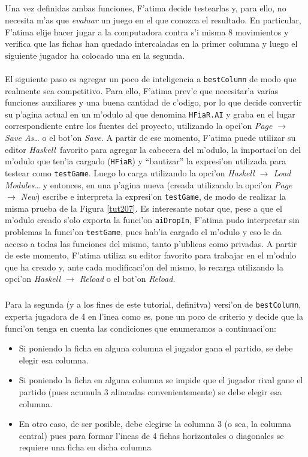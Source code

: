 \documentclass[a4paper]{article}
\newcommand{\haskell}{\textsl{Haskell}}
\begin{document}
\newpage
\subparagraph{}Una vez definidas ambas funciones, F'atima decide testearlas y, para ello, no necesita m'as que \textsl{evaluar} un juego en el que conozca el resultado.  En particular, F'atima elije hacer jugar a la computadora contra s'i misma 8 movimientos y verifica que las fichas han quedado intercaladas en la primer columna y luego el siguiente jugador ha colocado una en la segunda.
\paragraph{}El siguiente paso es agregar un poco de inteligencia a \texttt{bestColumn} de modo que realmente sea competitivo.  Para ello, F'atima prev'e que necesitar'a varias funciones auxiliares y una buena cantidad de c'odigo, por lo que decide convertir su p'agina actual en un m'odulo al que denomina \texttt{HFiaR.AI} y graba en el lugar correspondiente entre los fuentes del proyecto, utilizando la opci'on \textsl{Page $\rightarrow$ Save As\ldots} o el bot'on \textsl{Save}.  A partir de ese momento, F'atima puede utilizar su editor \haskell\ favorito para agregar la cabecera del m'odulo, la importaci'on del m'odulo que ten'ia cargado (\texttt{HFiaR}) y ``bautizar'' la expresi'on utilizada para testear como \texttt{testGame}.  Luego lo carga utilizando la opci'on \textsl{Haskell $\rightarrow$ Load Modules\ldots} y entonces, en una p'agina nueva (creada utilizando la opci'on \textsl{Page $\rightarrow$ New}) escribe e interpreta la expresi'on \texttt{testGame}, de modo de realizar la misma prueba de la Figura \ref{tut207}.  Es interesante notar que, pese a que el m'odulo creado s'olo exporta la funci'on \texttt{aiDropIn}, F'atima pudo interpretar sin problemas la funci'on \texttt{testGame}, pues hab'ia cargado el m'odulo y eso le da acceso a todas las funciones del mismo, tanto p'ublicas como privadas.  A partir de este momento, F'atima utiliza su editor favorito para trabajar en el m'odulo que ha creado y, ante cada modificaci'on del mismo, lo recarga utilizando la opci'on \textsl{Haskell $\rightarrow$ Reload} o el bot'on \textsl{Reload}.
\subparagraph{}Para la segunda (y a los fines de este tutorial, definitva) versi'on de \texttt{bestColumn}, experta jugadora de 4 en l'inea como es, pone un poco de criterio y decide que la funci'on tenga en cuenta las condiciones que enumeramos a continuaci'on:
\begin{itemize}
	\item Si poniendo la ficha en alguna columna el jugador gana el partido, se debe elegir esa columna.
	\item Si poniendo la ficha en alguna columna se impide que el jugador rival gane el partido (pues acumula 3 alineadas convenientemente) se debe elegir esa columna.
	\item En otro caso, de ser posible, debe elegirse la columna 3 (o sea, la columna central) pues para formar l'ineas de 4 fichas horizontales o diagonales se requiere una ficha en dicha columna
\end{itemize}
\end{document}
